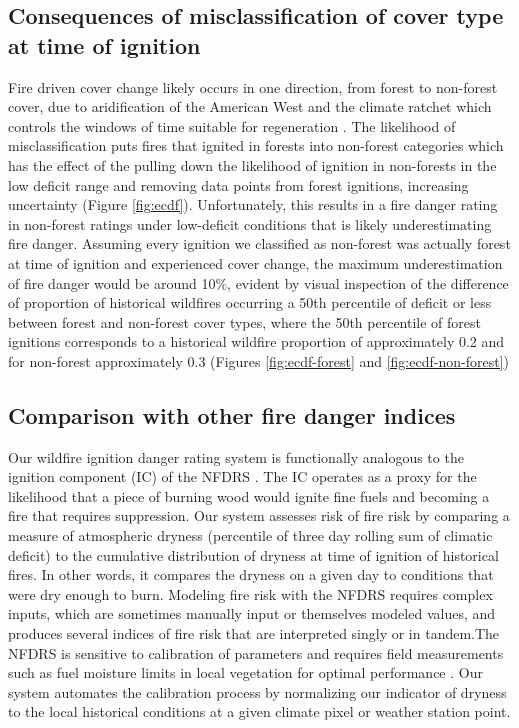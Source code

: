 \documentclass[11p]{article}
\begin{document}
\subsection{Consequences of misclassification of cover type at time of ignition}

Fire driven cover change likely occurs in one direction, from forest to non-forest cover, due to aridification of the American West and the climate ratchet which controls the windows of time suitable for regeneration \citep{jacksonEcologyRatchetEvents2009}. The likelihood of misclassification puts fires that ignited in forests into non-forest categories which has the effect of the pulling down the likelihood of ignition in non-forests in the low deficit range and removing data points from forest ignitions, increasing uncertainty (Figure \ref{fig:ecdf}). Unfortunately, this results in a fire danger rating in non-forest ratings under low-deficit conditions that is likely underestimating fire danger. Assuming every ignition we classified as non-forest was actually forest at time of ignition and experienced cover change, the maximum underestimation of fire danger would be around 10\%, evident by visual inspection of the difference of proportion of historical wildfires occurring a 50th percentile of deficit or less between forest and non-forest cover types, where the 50th percentile of forest ignitions corresponds to a historical wildfire proportion of approximately 0.2 and for non-forest approximately 0.3 (Figures \ref{fig:ecdf-forest} and \ref{fig:ecdf-non-forest}) 

\subsection{Comparison with other fire danger indices}

Our wildfire ignition danger rating system is functionally analogous to the ignition component (IC) of the NFDRS \citep{jollyModernizingUSNational2024}. The IC operates as a proxy for the likelihood that a piece of burning wood would ignite fine fuels and becoming a fire that requires suppression. Our system assesses risk of fire risk by comparing a measure of atmospheric dryness (percentile of three day rolling sum of climatic deficit) to the cumulative distribution of dryness at time of ignition of historical fires. In other words, it compares the dryness on a given day to conditions that were dry enough to burn. Modeling fire risk with the NFDRS requires complex inputs, which are sometimes manually input or themselves modeled values, and produces several indices of fire risk that are interpreted singly or in tandem.The NFDRS is sensitive to calibration of parameters and requires field measurements such as fuel moisture limits in local vegetation for optimal performance \citep{jollyModernizingUSNational2024}. Our system automates the calibration process by normalizing our indicator of dryness to the local historical conditions at a given climate pixel or weather station point.
\end{document}
